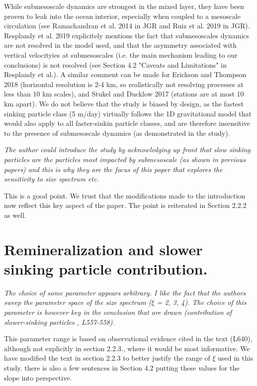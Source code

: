 \documentclass[12pt,letter]{article}
\begin{document}
{\color{blue} While submesoscale dynamics are strongest in the mixed layer, they have been proven to leak into the ocean interior, especially when coupled to a mesoscale circulation (see Ramachandran et al. 2014 in JGR and Ruiz et al. 2019 in JGR). Resplandy et al. 2019 explicitely mentions the fact that submesoscales dynamics are not resolved in the model used, and that the asymmetry associated with vertical velocityies at submesoscales  (i.e. the main mechanism leading to our conclusions) is not resolved (see Section 4.2 "Caveats and Limitations" in Resplandy et al.). A similar comment can be made for Erickson and Thompson 2018 (horizontal resolution is 2-4 km, so realistically not resolving processes at less than 10 km scales), and Stukel and Ducklow 2017 (stations are at most 10 km apart).
We do not believe that the study is biased by design, as the fastest sinking particle class (5 m/day) virtually follows the 1D gravitational model that would also apply to all faster-sinkin particle classes, and are therefore insensitive to the presence of submesoscale dynamics (as demonstrated in the study).\\}

\textit{The author could introduce the study by acknowledging up front that slow sinking particles are the particles most impacted by submesoscale (as shown in previous papers) and this is why they are the focus of this paper that explores the sensitivity to size spectrum etc.}

{\color{blue}
	This is a good point. We trust that the modifications made to the introduction now reflect this key aspect of the paper. The point is reiterated in Section 2.2.2 as well.}


\section*{Remineralization and slower sinking particle contribution.}
\textit{The choice of some parameter appears arbitrary. I like the fact that the authors sweep the parameter space of the size spectrum ($\xi$ = 2, 3, 4). The choice of this parameter is however key in the conclusion that are drawn (contribution of slower-sinking particles , L557-558).}

{\color{blue}
	This parameter range is based on observational evidence cited in the text (L640), although not explicitly in section 2.2.3., where it would be most informative. We have modified the text in section 2.2.3 to better justify the range of $\xi$ used in this study. there is also a few sentences in Section 4.2 putting these values for the slope into perspective. \\} %
\end{document}
